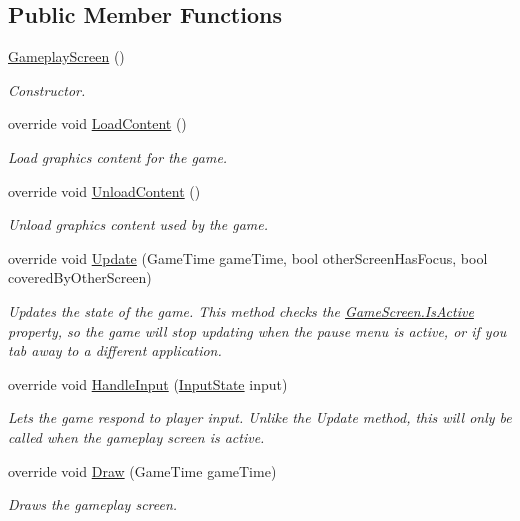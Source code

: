 \subsection*{Public Member Functions}
\begin{DoxyCompactItemize}
\item 
\hyperlink{classCityMania_1_1GameplayScreen_afcaf9cbe3f18bffb322a8d367428c05b}{GameplayScreen} ()
\begin{DoxyCompactList}\small\item\em Constructor. \item\end{DoxyCompactList}\item 
override void \hyperlink{classCityMania_1_1GameplayScreen_a6bc115541e6000548bf828762044fd46}{LoadContent} ()
\begin{DoxyCompactList}\small\item\em Load graphics content for the game. \item\end{DoxyCompactList}\item 
override void \hyperlink{classCityMania_1_1GameplayScreen_ad61c20401840e56538b55b6ae3704f45}{UnloadContent} ()
\begin{DoxyCompactList}\small\item\em Unload graphics content used by the game. \item\end{DoxyCompactList}\item 
override void \hyperlink{classCityMania_1_1GameplayScreen_a721faf1bb18e20ca09310f3f5240de81}{Update} (GameTime gameTime, bool otherScreenHasFocus, bool coveredByOtherScreen)
\begin{DoxyCompactList}\small\item\em Updates the state of the game. This method checks the \hyperlink{classCityMania_1_1GameScreen_a50204f4b2c99f890598285395bfeda02}{GameScreen.IsActive} property, so the game will stop updating when the pause menu is active, or if you tab away to a different application. \item\end{DoxyCompactList}\item 
override void \hyperlink{classCityMania_1_1GameplayScreen_a3491283225749877c3325ebba7a9bd42}{HandleInput} (\hyperlink{classCityMania_1_1InputState}{InputState} input)
\begin{DoxyCompactList}\small\item\em Lets the game respond to player input. Unlike the Update method, this will only be called when the gameplay screen is active. \item\end{DoxyCompactList}\item 
override void \hyperlink{classCityMania_1_1GameplayScreen_aff1697e936e9c230616cadcafbf410ee}{Draw} (GameTime gameTime)
\begin{DoxyCompactList}\small\item\em Draws the gameplay screen. \item\end{DoxyCompactList}\end{DoxyCompactItemize}


